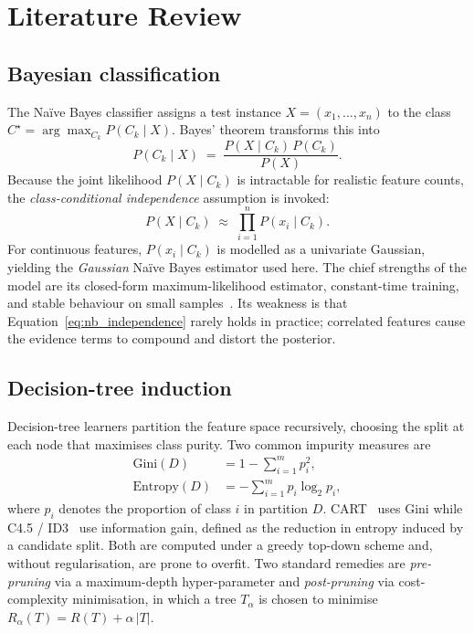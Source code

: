 \documentclass[10pt,a4paper,twocolumn]{article}
\begin{document}
\section{Literature Review}\label{sec:litreview}

\subsection{Bayesian classification}
The Na\"ive Bayes classifier assigns a test instance $X = (x_1, \dots, x_n)$ to the class
$C^\star = \arg\max_{C_k} P(C_k \mid X)$. Bayes' theorem transforms this into
\begin{equation}\label{eq:bayes}
P(C_k \mid X) \; = \; \frac{P(X \mid C_k)\, P(C_k)}{P(X)} .
\end{equation}
Because the joint likelihood $P(X\mid C_k)$ is intractable for realistic feature counts,
the \emph{class-conditional independence} assumption is invoked:
\begin{equation}\label{eq:nb_independence}
P(X \mid C_k) \; \approx \; \prod_{i=1}^n P(x_i \mid C_k) .
\end{equation}
For continuous features, $P(x_i\mid C_k)$ is modelled as a univariate Gaussian, yielding
the \emph{Gaussian} Na\"ive Bayes estimator used here. The chief strengths of the model
are its closed-form maximum-likelihood estimator, constant-time training, and stable
behaviour on small samples~\cite{mitchell1997ml}. Its weakness is that
Equation~\eqref{eq:nb_independence} rarely holds in practice; correlated features cause
the evidence terms to compound and distort the posterior.

\subsection{Decision-tree induction}
Decision-tree learners partition the feature space recursively, choosing the split at
each node that maximises class purity. Two common impurity measures are
\begin{align}
\text{Gini}(D)    &= 1 - \sum_{i=1}^{m} p_i^2, \label{eq:gini}\\
\text{Entropy}(D) &= -\sum_{i=1}^{m} p_i \log_2 p_i, \label{eq:entropy}
\end{align}
where $p_i$ denotes the proportion of class $i$ in partition $D$. CART~\cite{breiman1984}
uses Gini while C4.5 / ID3~\cite{quinlan1986} use information gain, defined as the
reduction in entropy induced by a candidate split. Both are computed under a greedy
top-down scheme and, without regularisation, are prone to overfit. Two standard remedies
are \emph{pre-pruning} via a maximum-depth hyper-parameter and \emph{post-pruning} via
cost-complexity minimisation, in which a tree $T_\alpha$ is chosen to minimise
$R_\alpha(T) = R(T) + \alpha\,|T|$.
\end{document}
